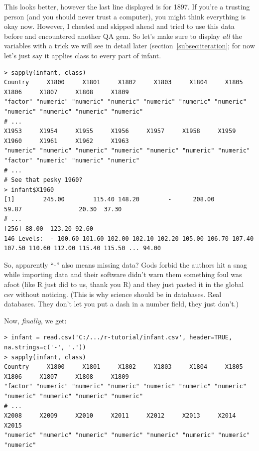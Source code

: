 \documentclass{report}
\newcommand{\code}[1]{\textsf{\ttfamily #1}}
\begin{document}
		This looks better, however the last line displayed is for 1897. If you're a trusting person (and you should never trust a computer), you might think everything is okay now. However, I cheated and skipped ahead and tried to use this data before and encountered another QA gem. So let's make sure to display \emph{all} the variables with a trick we will see in detail later (section~\ref{subsec:iteration}; for now let's just say it applies \code{class} to every part of \code{infant}.
		\begin{verbatim}
> sapply(infant, class)
Country     X1800     X1801     X1802     X1803     X1804     X1805     X1806     X1807     X1808     X1809 
"factor" "numeric" "numeric" "numeric" "numeric" "numeric" "numeric" "numeric" "numeric" "numeric" "numeric" 
# ...
X1953     X1954     X1955     X1956     X1957     X1958     X1959     X1960     X1961     X1962     X1963 
"numeric" "numeric" "numeric" "numeric" "numeric" "numeric" "numeric"  "factor" "numeric" "numeric" "numeric" 
# ...
# See that pesky 1960?
> infant$X1960
[1]        245.00        115.40 148.20        -      208.00               59.87                20.30  37.30 
# ...
[256] 88.00  123.20 92.60               
146 Levels:  - 100.60 101.60 102.00 102.10 102.20 105.00 106.70 107.40 107.50 110.60 112.00 115.40 115.50 ... 94.00
		\end{verbatim}
		
		So, apparently ``-'' also means missing data? Gods forbid the authors hit a snag while importing data and their software didn't warn them something foul was afoot (like R just did to us, thank you R) and they just pasted it in the global csv without noticing. (This is why science should be in databases. Real databases. They don't let you put a dash in a number field, they just don't.)
		
		Now, \emph{finally}, we get:
		\begin{verbatim}
> infant = read.csv('C:/.../r-tutorial/infant.csv', header=TRUE, na.strings=c('-', '.'))
> sapply(infant, class)
Country     X1800     X1801     X1802     X1803     X1804     X1805     X1806     X1807     X1808     X1809 
"factor" "numeric" "numeric" "numeric" "numeric" "numeric" "numeric" "numeric" "numeric" "numeric" "numeric" 
# ...
X2008     X2009     X2010     X2011     X2012     X2013     X2014     X2015 
"numeric" "numeric" "numeric" "numeric" "numeric" "numeric" "numeric" "numeric"
		\end{verbatim}
		
\end{document}
